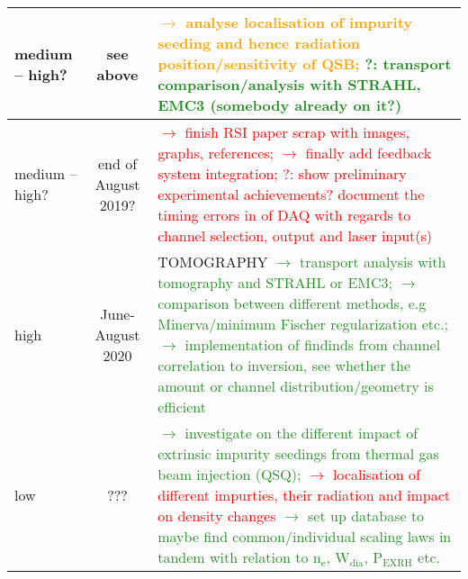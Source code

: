 \documentclass[%
    a4,
    10pt,
    twoside
    ]{%
    scrreprt%
    }
\newcommand{\ix}[1]{_\text{#1}}
\begin{document}
\begin{table}[h!]
\begin{tabular}{l|c|p{}}
                medium -- high? & %
                see above & %
                \textcolor{orange}{%
                  $\rightarrow$ analyse localisation of impurity seeding and hence radiation position/sensitivity of QSB;%
                }\newline%
                \textcolor{ForestGreen}{%
                  ?: transport comparison/analysis with STRAHL, EMC3 (somebody already on it?)%
                }%
                \\\hline%

                medium -- high? & %
                end of August 2019? & %
                \textcolor{red}{%
                  $\rightarrow$ finish RSI paper scrap with images, graphs, references;%
                }\newline%
                \textcolor{red}{
                  $\rightarrow$ finally add feedback system integration;%
                }\newline%
                \textcolor{red}{
                  ?: show preliminary experimental achievements? document the timing errors in of DAQ with regards to channel selection, output and laser input(s)%
                }%
                \\\hline%

                high & %
                June-August 2020 & %
                TOMOGRAPHY\newline%
                \textcolor{ForestGreen}{%
                  $\rightarrow$ transport analysis with tomography and STRAHL or EMC3;%
                }\newline%
                \textcolor{ForestGreen}{%
                  $\rightarrow$ comparison between different methods, e.g Minerva/minimum Fischer regularization etc.;%
                }\newline%
                \textcolor{ForestGreen}{%
                  $\rightarrow$ implementation of findinds from channel correlation to inversion, see whether the amount or channel distribution/geometry is efficient%
                }%
                \\\hline%

                low & %
                ??? & %
                \textcolor{ForestGreen}{%
                  $\rightarrow$ investigate on the different impact of extrinsic impurity seedings from thermal gas beam injection (QSQ);%
                }\newline%
                \textcolor{red}{%
                  $\rightarrow$ localisation of different impurties, their radiation and impact on density changes%
                }\newline%
                \textcolor{ForestGreen}{%
                  $\rightarrow$ set up database to maybe find common/individual scaling laws in tandem with relation to n$\ix{e}$, W$\ix{dia}$, P$\ix{EXRH}$ etc.%
                }%
                \\\hline%


\end{tabular}
\end{table}
\end{document}
